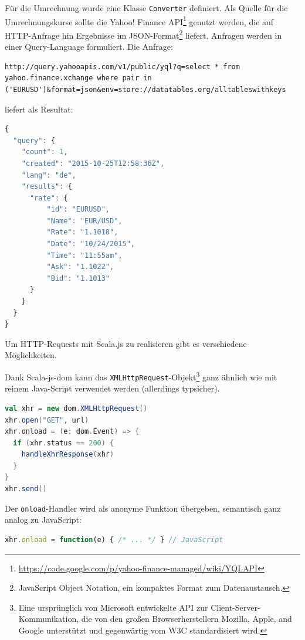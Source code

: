 \documentclass[a4paper, 12pt, hidelinks, listof=totoc, listoftables=totoc, bibliography=totoc]{scrreprt}
\newcommand{\code}[1]{\lstinline[language=Scala, style=inline]|#1|}
\newcommand{\scala}[1]{\lstinline[language=Scala, style=inline]|#1|}
\begin{document}
Für die Umrechnung wurde eine Klasse \scala{Converter} definiert. Als Quelle für die Umrechnungskurse sollte die Yahoo! Finance API\footnote{\url{https://code.google.com/p/yahoo-finance-managed/wiki/YQLAPI}} genutzt werden, die auf HTTP-Anfrage hin Ergebnisse im JSON-Format\footnote{JavaScript Object Notation, ein kompaktes Format zum Datenaustausch.} liefert. Anfragen werden in einer Query-Language formuliert. Die Anfrage:

\begin{lstlisting}[aboveskip=0pt, style=snippet]
http://query.yahooapis.com/v1/public/yql?q=select * from yahoo.finance.xchange where pair in ('EURUSD')&format=json&env=store://datatables.org/alltableswithkeys
\end{lstlisting}

liefert als Resultat:

\begin{lstlisting}[language=JavaScript, style=snippet]
{
  "query": {
    "count": 1,
    "created": "2015-10-25T12:58:36Z",
    "lang": "de",
    "results": {
      "rate": {
          "id": "EURUSD",
          "Name": "EUR/USD",
          "Rate": "1.1018",
          "Date": "10/24/2015",
          "Time": "11:55am",
          "Ask": "1.1022",
          "Bid": "1.1013"
      }
    }
  }
}
\end{lstlisting}

Um HTTP-Requests mit Scala.js zu realisieren gibt es verschiedene Möglichkeiten\cite[\#UsingWebServices]{haoyi.HOS}.

Dank Scala-js-dom kann das \code{XMLHttpRequest}-Objekt\footnote{Eine ursprünglich von Microsoft entwickelte API zur Client-Server-Kommunikation, die von den großen Browserherstellern Mozilla, Apple, and Google unterstützt und gegenwärtig vom W3C standardisiert wird.\cite{mdn.XHR}} ganz ähnlich wie mit reinem Java-Script verwendet werden (allerdings typsicher).

\begin{lstlisting}[language=Scala, caption={HTTP-Aufruf mit XMLHttpRequest.}]
val xhr = new dom.XMLHttpRequest()
xhr.open("GET", url)
xhr.onload = (e: dom.Event) => {
  if (xhr.status == 200) {
    handleXhrResponse(xhr)
  }
}
xhr.send()
\end{lstlisting}

Der \scala{onload}-Handler wird als anonyme Funktion übergeben, semantisch ganz analog zu JavaScript:

\begin{lstlisting}[language=JavaScript, style=snippet]
xhr.onload = function(e) { /* ... */ } // JavaScript
\end{lstlisting}
\end{document}
